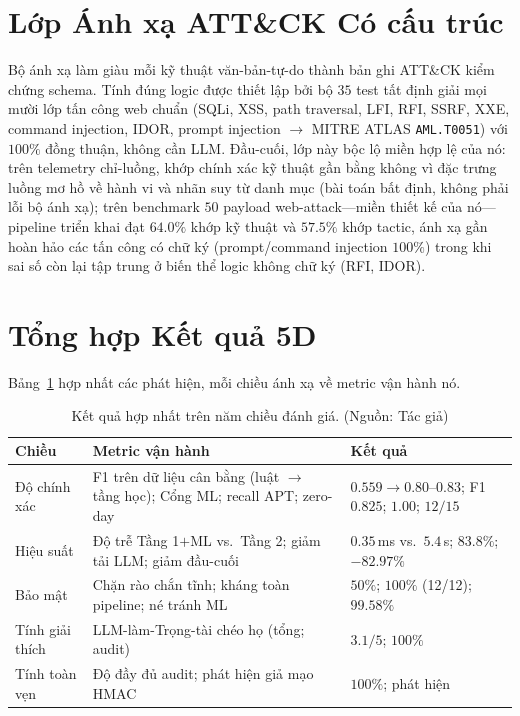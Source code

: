 \section{Lớp Ánh xạ ATT\&CK Có cấu trúc}
Bộ ánh xạ làm giàu mỗi kỹ thuật văn-bản-tự-do thành bản ghi ATT\&CK kiểm chứng schema. Tính đúng logic được thiết lập bởi bộ $35$ test tất định giải mọi mười lớp tấn công web chuẩn (SQLi, XSS, path traversal, LFI, RFI, SSRF, XXE, command injection, IDOR, prompt injection $\rightarrow$ MITRE ATLAS \texttt{AML.T0051}) với $100\%$ đồng thuận, không cần LLM. Đầu-cuối, lớp này bộc lộ miền hợp lệ của nó: trên telemetry chỉ-luồng, khớp chính xác kỹ thuật gần bằng không vì đặc trưng luồng mơ hồ về hành vi và nhãn suy từ danh mục (bài toán bất định, không phải lỗi bộ ánh xạ); trên benchmark $50$ payload web-attack---miền thiết kế của nó---pipeline triển khai đạt $64.0\%$ khớp kỹ thuật và $57.5\%$ khớp tactic, ánh xạ gần hoàn hảo các tấn công có chữ ký (prompt/command injection $100\%$) trong khi sai số còn lại tập trung ở biến thể logic không chữ ký (RFI, IDOR).

\section{Tổng hợp Kết quả 5D}
Bảng~\ref{tab:5d_summary} hợp nhất các phát hiện, mỗi chiều ánh xạ về metric vận hành nó.

\begin{table}[!htbp]
    \centering
    \caption{Kết quả hợp nhất trên năm chiều đánh giá. (Nguồn: Tác giả)}
    \label{tab:5d_summary}
    \begin{tabular}{|>{\raggedright\arraybackslash}p{}|>{\raggedright\arraybackslash}p{}|>{\raggedright\arraybackslash}p{}|}
        \hline
        \textbf{Chiều} & \textbf{Metric vận hành} & \textbf{Kết quả} \\ \hline
        Độ chính xác & F1 trên dữ liệu cân bằng (luật $\rightarrow$ tầng học); Cổng ML; recall APT; zero-day & $0.559 \rightarrow 0.80$--$0.83$; F1 $0.825$; $1.00$; $12/15$ \\ \hline
        Hiệu suất & Độ trễ Tầng 1$+$ML vs.\ Tầng 2; giảm tải LLM; giảm đầu-cuối & $0.35$\,ms vs.\ $5.4$\,s; $83.8\%$; $-82.97\%$ \\ \hline
        Bảo mật & Chặn rào chắn tĩnh; kháng toàn pipeline; né tránh ML & $50\%$; $100\%$ (12/12); $99.58\%$ \\ \hline
        Tính giải thích & LLM-làm-Trọng-tài chéo họ (tổng; audit) & $3.1/5$; $100\%$ \\ \hline
        Tính toàn vẹn & Độ đầy đủ audit; phát hiện giả mạo HMAC & $100\%$; phát hiện \\ \hline
    \end{tabular}
\end{table}

